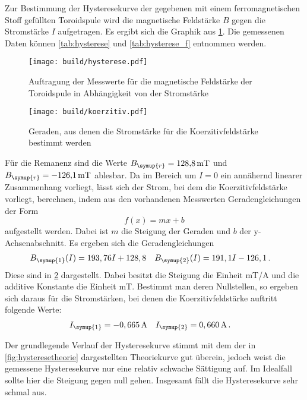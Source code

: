 Zur Bestimmung der Hysteresekurve der gegebenen mit einem ferromagnetischen Stoff
gefüllten Toroidspule wird die magnetische Feldstärke $B$ gegen die Stromstärke
$I$ aufgetragen. Es ergibt sich die Graphik aus \ref{fig:hysterese}. Die gemessenen
Daten können \ref{tab:hysterese} und \ref{tab:hysterese_f}  entnommen werden.

\begin{figure}
  \centering
  \texttt{[image: build/hysterese.pdf]}
  \caption{Auftragung der Messwerte für die magnetische Feldstärke der Toroidspule
  in Abhängigkeit von der Stromstärke}
  \label{fig:hysterese}
\end{figure}

\begin{figure}
  \centering
  \texttt{[image: build/koerzitiv.pdf]}
  \caption{Geraden, aus denen die Stromstärke für die Koerzitivfeldstärke bestimmt werden}
  \label{fig:koerzitiv}
\end{figure}


Für die Remanenz sind die Werte $B_{\symup{r}} = \SI{128,8}{\milli\tesla}$ und $B_{\symup{r}}=\SI{-126,1}{\milli\tesla}$
ablesbar. Da im Bereich um $I=0$ ein annähernd linearer Zusammenhang vorliegt, lässt
sich der Strom, bei dem die Koerzitivfeldstärke vorliegt, berechnen, indem aus den vorhandenen
Messwerten Geradengleichungen der Form
\begin{equation}
  f(x)=mx+b
  \end{equation}
aufgestellt werden. Dabei ist $m$ die Steigung der Geraden und $b$ der y-Achsenabschnitt.
Es ergeben sich die Geradengleichungen
\begin{align}
  B_{\symup{1}}(I)&=193,76I+128,8 & B_{\symup{2}}(I)&=191,1I-126,1\,.
\end{align}
Diese sind in \ref{fig:koerzitiv} dargestellt. Dabei besitzt die Steigung die Einheit
mT/A und die additive Konstante die Einheit mT.
Bestimmt man deren Nullstellen, so ergeben sich daraus für die Stromstärken, bei
denen die Koerzitivfeldstärke auftritt folgende Werte:
\begin{align}
  I_{\symup{1}}&=-0,665\,\text{A} & I_{\symup{2}}&=0,660\,\text{A}\,.
\end{align}


Der grundlegende Verlauf der Hysteresekurve stimmt mit dem der in \ref{fig:hysteresetheorie}
dargestellten Theoriekurve gut überein, jedoch weist
die gemessene Hysteresekurve nur eine relativ schwache Sättigung auf. Im Idealfall sollte
hier die Steigung gegen null gehen. Insgesamt fällt die Hysteresekurve sehr schmal aus.

